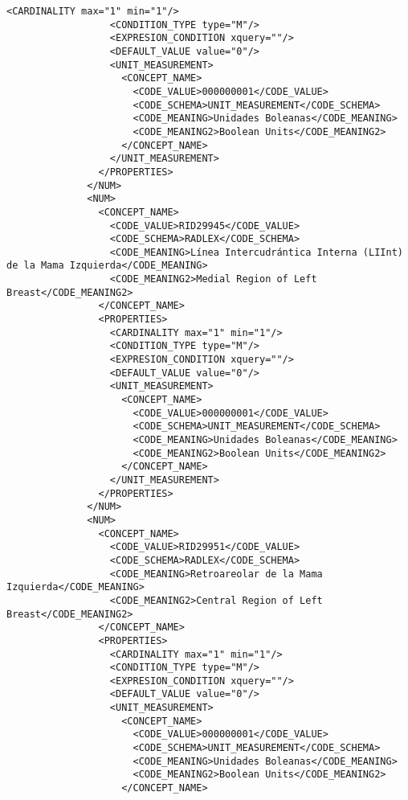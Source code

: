 \begin{lstlisting}[label=some-code,caption=Some Code]
                  <CARDINALITY max="1" min="1"/>
                  <CONDITION_TYPE type="M"/>
                  <EXPRESION_CONDITION xquery=""/>
                  <DEFAULT_VALUE value="0"/>
                  <UNIT_MEASUREMENT>
                    <CONCEPT_NAME>
                      <CODE_VALUE>000000001</CODE_VALUE>
                      <CODE_SCHEMA>UNIT_MEASUREMENT</CODE_SCHEMA>
                      <CODE_MEANING>Unidades Boleanas</CODE_MEANING>
                      <CODE_MEANING2>Boolean Units</CODE_MEANING2>
                    </CONCEPT_NAME>
                  </UNIT_MEASUREMENT>
                </PROPERTIES>
              </NUM>
              <NUM>
                <CONCEPT_NAME>
                  <CODE_VALUE>RID29945</CODE_VALUE>
                  <CODE_SCHEMA>RADLEX</CODE_SCHEMA>
                  <CODE_MEANING>Línea Intercudrántica Interna (LIInt) de la Mama Izquierda</CODE_MEANING>
                  <CODE_MEANING2>Medial Region of Left Breast</CODE_MEANING2>
                </CONCEPT_NAME>
                <PROPERTIES>
                  <CARDINALITY max="1" min="1"/>
                  <CONDITION_TYPE type="M"/>
                  <EXPRESION_CONDITION xquery=""/>
                  <DEFAULT_VALUE value="0"/>
                  <UNIT_MEASUREMENT>
                    <CONCEPT_NAME>
                      <CODE_VALUE>000000001</CODE_VALUE>
                      <CODE_SCHEMA>UNIT_MEASUREMENT</CODE_SCHEMA>
                      <CODE_MEANING>Unidades Boleanas</CODE_MEANING>
                      <CODE_MEANING2>Boolean Units</CODE_MEANING2>
                    </CONCEPT_NAME>
                  </UNIT_MEASUREMENT>
                </PROPERTIES>
              </NUM>
              <NUM>
                <CONCEPT_NAME>
                  <CODE_VALUE>RID29951</CODE_VALUE>
                  <CODE_SCHEMA>RADLEX</CODE_SCHEMA>
                  <CODE_MEANING>Retroareolar de la Mama Izquierda</CODE_MEANING>
                  <CODE_MEANING2>Central Region of Left Breast</CODE_MEANING2>
                </CONCEPT_NAME>
                <PROPERTIES>
                  <CARDINALITY max="1" min="1"/>
                  <CONDITION_TYPE type="M"/>
                  <EXPRESION_CONDITION xquery=""/>
                  <DEFAULT_VALUE value="0"/>
                  <UNIT_MEASUREMENT>
                    <CONCEPT_NAME>
                      <CODE_VALUE>000000001</CODE_VALUE>
                      <CODE_SCHEMA>UNIT_MEASUREMENT</CODE_SCHEMA>
                      <CODE_MEANING>Unidades Boleanas</CODE_MEANING>
                      <CODE_MEANING2>Boolean Units</CODE_MEANING2>
                    </CONCEPT_NAME>

\end{lstlisting}
